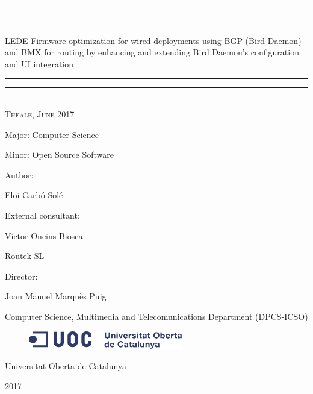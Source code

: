\begin{titlepage}
    \centering
    \vspace*{\baselineskip}
    \rule{\textwidth}{1.6pt}\vspace*{-\baselineskip}\vspace*{2pt}
    \rule{\textwidth}{0.4pt}\\[\baselineskip]
    {\LARGE LEDE Firmware optimization for wired deployments using BGP (Bird Daemon) and BMX for routing by enhancing and extending Bird Daemon's configuration and UI integration}
    \rule{\textwidth}{0.4pt}\vspace*{-\baselineskip}\vspace{3.2pt}
    \rule{\textwidth}{1.6pt}\\[\baselineskip]
    \scshape
    Theale, June 2017\par
    \vspace*{2\baselineskip}
    Major: Computer Science\par
    Minor: Open Source Software\par
    \vspace*{2\baselineskip}
    Author: \\
    {\Large Eloi Carb\'{o} Sol\'{e}\par}
    \vspace*{1\baselineskip}
    External consultant: \\
    {\large V\'{i}ctor Oncins Biosca\par}
    Routek SL\par
    \vspace*{1\baselineskip}
    Director: \\ 
    {\large Joan Manuel Marqu\`{e}s Puig\par}
    Computer Science, Multimedia and Telecomunications Department (DPCS-ICSO)
    \vfill
    \begin{figure}[ht!]
        \centering
        \includegraphics[width=0.6\textwidth]{images/logo}
	\end{figure}
    {\large Universitat Oberta de Catalunya}\par
    {\scshape 2017}
\end{titlepage}

\newpage


\newpage


\cleardoublepage

\pagestyle{plain}


\def\contentsname{Index}
\tableofcontents
\newpage

\listoffigures
\newpage
\lstlistoflistings
\newpage

